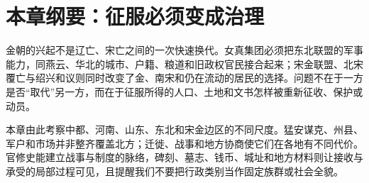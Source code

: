 \section{本章纲要：征服必须变成治理}

金朝的兴起不是辽亡、宋亡之间的一次快速换代。女真集团必须把东北联盟的军事能力，同燕云、华北的城市、户籍、粮道和旧政权官民接合起来；宋金联盟、北宋覆亡与绍兴和议则同时改变了金、南宋和仍在流动的居民的选择。问题不在于一方是否“取代”另一方，而在于征服所得的人口、土地和文书怎样被重新征收、保护或动员。

本章由此考察中都、河南、山东、东北和宋金边区的不同尺度。猛安谋克、州县、军户和市场并非整齐覆盖北方；迁徙、战事和地方协商使它们在各地有不同代价。官修史能建立战事与制度的脉络，碑刻、墓志、钱币、城址和地方材料则让接收与承受的局部过程可见，且提醒我们不要把行政类别当作固定族群或社会全貌。
